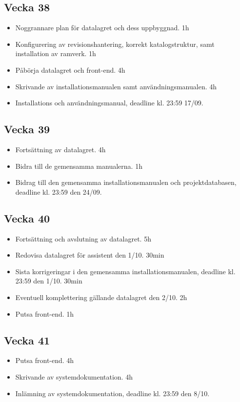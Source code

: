 \documentclass{TDP003mall}
\begin{document}
\subsection{Vecka 38}
\begin{itemize}
\item Noggrannare plan för datalagret och dess uppbyggnad. 1h
\item Konfigurering av revisionshantering, korrekt katalogstruktur, samt installation av ramverk. 1h
\item Påbörja datalagret och front-end. 4h
\item Skrivande av installationsmanualen samt användningsmanualen. 4h
\item Installations och användningsmanual, deadline kl. 23:59 17/09.
\end{itemize}

\subsection{Vecka 39}
\begin{itemize}
\item Fortsättning av datalagret. 4h
\item Bidra till de gemensamma manualerna. 1h
\item Bidrag till den gemensamma installationsmanualen och projektdatabasen, deadline kl. 23:59 den 24/09.
\end{itemize}

\subsection{Vecka 40}
\begin{itemize}
\item Fortsättning och avslutning av datalagret. 5h
\item Redovisa datalagret för assistent den 1/10. 30min
\item Sista korrigeringar i den gemensamma installationsmanualen, deadline kl. 23:59 den 1/10. 30min
\item Eventuell komplettering gällande datalagret den 2/10. 2h
\item Putsa front-end. 1h
\end{itemize}

\subsection{Vecka 41}
\begin{itemize}
\item Putsa front-end. 4h
\item Skrivande av systemdokumentation. 4h
\item Inlämning av systemdokumentation, deadline kl. 23:59 den 8/10.
\end{itemize}
\end{document}
